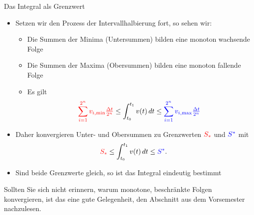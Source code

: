 
\begin{frame}{Das Integral als Grenzwert}
\begin{itemize}
    \item<+-> Setzen wir den Prozess der Intervallhalbierung fort, so sehen wir:
    \begin{itemize}
        \item Die Summen der Minima (Untersummen) bilden eine monoton wachsende Folge
        \item Die Summen der Maxima (Obersummen) bilden eine monoton fallende Folge
        \item Es gilt
        \begin{gather*}
                {\color{red}
        \sum_{i=1}^{2^n} v_{i,\text{min}} \tfrac{\Delta t}{2^n}
    }
    \le \int_{t_0}^{t_1} v(t) \,dt
    \le {\color{blue}
        \sum_{i=1}^{2^n} v_{i,\text{max}} \tfrac{\Delta t}{2^n}
    }        
        \end{gather*}
    \end{itemize}
        \item<+-> Daher konvergieren Unter- und Obersummen zu Grenzwerten ${\color{red}S_*}$ und ${\color{blue}S^*}$ mit
        \begin{gather*}
            {\color{red}S_*} \le \int_{t_0}^{t_1} v(t) \,dt
            \le {\color{blue}S^*}.
        \end{gather*}
        \item<+-> Sind beide Grenzwerte gleich, so ist das Integral eindeutig bestimmt
\end{itemize}
\end{frame}

\begin{Wdh}
    Sollten Sie sich nicht erinnern, warum monotone, beschränkte Folgen konvergieren, ist das eine gute Gelegenheit, den Abschnitt aus dem Vorsemester nachzulesen.
\end{Wdh}

